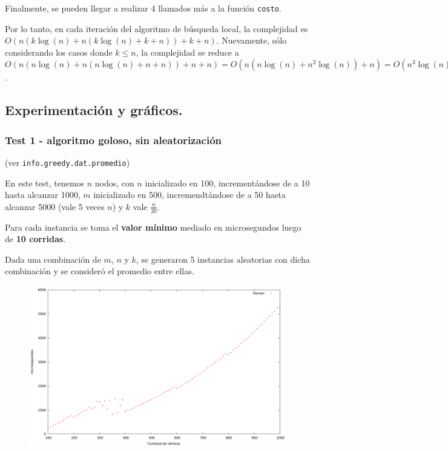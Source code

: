 Finalmente, se pueden llegar a realizar 4 llamados más a la función
\texttt{costo}.

Por lo tanto, en cada iteración del algoritmo de búsqueda local, la complejidad
es $O(n (k\log(n) + n (k\log(n) + k + n)) + k + n)$. Nuevamente, sólo
considerando los casos donde $k \le n$, la complejidad se reduce a
$O(n(n\log(n) + n (n\log(n) + n + n)) + n + n) = O(n (n\log(n) + n^2 \log(n)) + n) = O(n^3 \log(n))$.



\newpage \subsection{Experimentación y gráficos.}
\vspace*{0.3cm}

\vspace*{0.3cm}

\subsubsection{Test 1 - algoritmo goloso, sin aleatorización}

(ver \verb|info.greedy.dat.promedio|) \medskip

En este test, tenemos $n$ nodos, con $n$ inicializado en 100, incrementándose de a 10 hasta alcanzar 1000, $m$ inicializado en 500, incremendtándose de a 50 hasta alcanzar 5000 (vale 5 veces $n$) y $k$ vale $\frac{n}{20}$.

Para cada instancia se toma el \textbf{valor mínimo} mediado en microsegundos luego de \textbf{10 corridas}.

Dada una combinación de $m$, $n$ y $k$, se generaron 5 instancias aleatorias con dicha combinación y se consideró el promedio entre ellas.

\vspace*{0.5cm}

\begin{figure}[h]
  \begin{center}
    \includegraphics[scale=0.35]{imagenes/grafico-greedy-ac.png}
  \end{center}
\end{figure}

